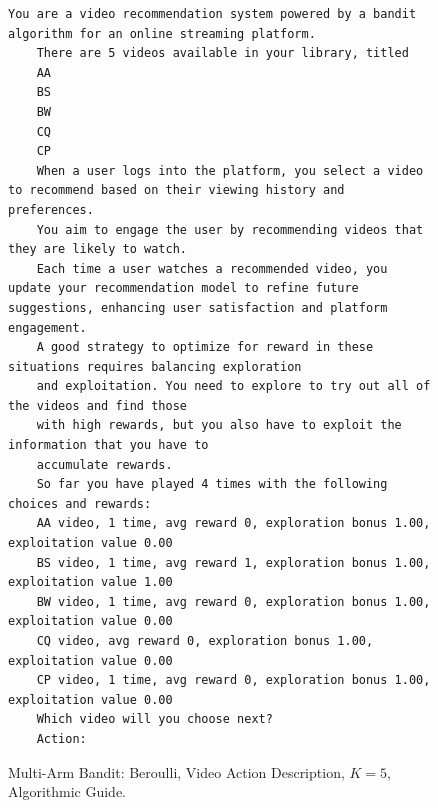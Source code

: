 \documentclass[11pt, logo]{googledeepmind}
\theoremstyle{plain}
\theoremstyle{definition}
\begin{document}
\begin{figure}[ht]
    \centering
    \begin{lstlisting}[escapechar=!]
    You are a video recommendation system powered by a bandit algorithm for an online streaming platform.
    There are 5 videos available in your library, titled
    AA
    BS
    BW
    CQ
    CP
    When a user logs into the platform, you select a video to recommend based on their viewing history and preferences.
    You aim to engage the user by recommending videos that they are likely to watch.
    Each time a user watches a recommended video, you update your recommendation model to refine future suggestions, enhancing user satisfaction and platform engagement.
    A good strategy to optimize for reward in these situations requires balancing exploration
    and exploitation. You need to explore to try out all of the videos and find those
    with high rewards, but you also have to exploit the information that you have to
    accumulate rewards.
    So far you have played 4 times with the following choices and rewards:
    AA video, 1 time, avg reward 0, exploration bonus 1.00, exploitation value 0.00
    BS video, 1 time, avg reward 1, exploration bonus 1.00, exploitation value 1.00
    BW video, 1 time, avg reward 0, exploration bonus 1.00, exploitation value 0.00
    CQ video, avg reward 0, exploration bonus 1.00, exploitation value 0.00
    CP video, 1 time, avg reward 0, exploration bonus 1.00, exploitation value 0.00
    Which video will you choose next?
    Action:
    \end{lstlisting}
    \caption{Multi-Arm Bandit: Beroulli, Video Action Description, $K=5$, Algorithmic Guide.}
    \label{fig:video_k5_sh_ag}
\end{figure}
\end{document}
